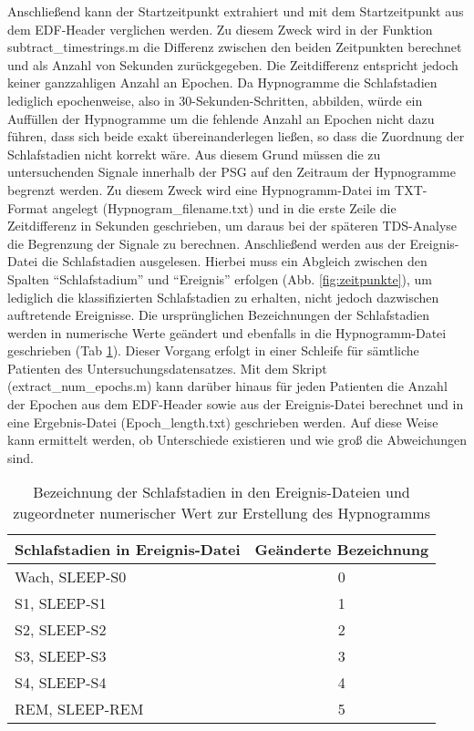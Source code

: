 Anschließend kann der Startzeitpunkt extrahiert und mit dem Startzeitpunkt aus dem \acs{EDF}-Header verglichen werden. Zu diesem Zweck wird in der Funktion subtract\_timestrings.m die Differenz zwischen den beiden Zeitpunkten berechnet und als Anzahl von Sekunden zurückgegeben. Die Zeitdifferenz entspricht jedoch keiner ganzzahligen Anzahl an Epochen. Da Hypnogramme die Schlafstadien lediglich epochenweise, also in 30-Sekunden-Schritten, abbilden, würde ein Auffüllen der Hypnogramme um die fehlende Anzahl an Epochen nicht dazu führen, dass sich beide exakt übereinanderlegen ließen, so dass die Zuordnung der Schlafstadien nicht korrekt wäre. Aus diesem Grund müssen die zu untersuchenden Signale innerhalb der \acs{PSG} auf den Zeitraum der Hypnogramme begrenzt werden. Zu diesem Zweck wird eine Hypnogramm-Datei im TXT-Format angelegt (Hypnogram\_filename.txt) und in die erste Zeile die Zeitdifferenz in Sekunden geschrieben, um daraus bei der späteren \acs{TDS}-Analyse die Begrenzung der Signale zu berechnen. Anschließend werden aus der Ereignis-Datei die Schlafstadien ausgelesen. Hierbei muss ein Abgleich zwischen den Spalten "`Schlafstadium"' und "`Ereignis"' erfolgen (Abb. \ref{fig:zeitpunkte}), um lediglich die klassifizierten Schlafstadien zu erhalten, nicht jedoch dazwischen auftretende Ereignisse. Die ursprünglichen Bezeichnungen der Schlafstadien werden in numerische Werte geändert und ebenfalls in die Hypnogramm-Datei geschrieben (Tab \ref{tab:schlafstadien}). Dieser Vorgang erfolgt in einer Schleife für sämtliche Patienten des Untersuchungsdatensatzes. Mit dem Skript (extract\_num\_epochs.m) kann darüber hinaus für jeden Patienten die Anzahl der Epochen aus dem \acs{EDF}-Header sowie aus der Ereignis-Datei berechnet und in eine Ergebnis-Datei (Epoch\_length.txt) geschrieben werden. Auf diese Weise kann ermittelt werden, ob Unterschiede existieren und wie groß die Abweichungen sind.

\begin{table}[H] 
\centering
\begin{tabularx}{0.785\textwidth}{Xc}
\toprule
\multicolumn{1}{l}{\textbf{Schlafstadien in Ereignis-Datei}} & \multicolumn{1}{c}{\textbf{Geänderte Bezeichnung}}\\
\midrule 
Wach, SLEEP-S0 & 0\\
S1, SLEEP-S1 & 1\\
S2, SLEEP-S2 & 2\\
S3, SLEEP-S3 & 3\\
S4, SLEEP-S4 & 4\\
REM, SLEEP-REM & 5\\
\bottomrule
\end{tabularx}
\caption[Bezeichnung der Schlafstadien]{Bezeichnung der Schlafstadien in den Ereignis-Dateien und zugeordneter numerischer Wert zur Erstellung des Hypnogramms}
\label{tab:schlafstadien}
\end{table}
 
